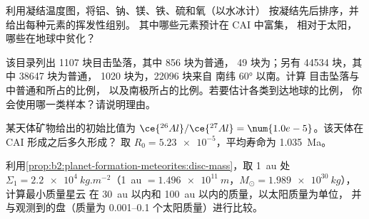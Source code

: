 \begin{exercise}[$\star$]\label{exo:b2:planet-formation-meteorites:2}
利用凝结温度图，将铝、钠、镁、铁、硫和氧（以水冰计）
按凝结先后排序，并给出每种元素的挥发性组别。
其中哪些元素预计在 CAI 中富集，
相对于太阳，哪些在地球中贫化？
\end{exercise}

\begin{exercise}[$\star$]\label{exo:b2:planet-formation-meteorites:3}
该目录列出 \num{1107} 块目击坠落，其中 856 块为普通，
49 块为；另有 \num{44534} 块，其中 \num{38647} 块为普通，
\num{1020} 块为，\num{22096} 块来自 南纬 \ang{60} 以南。计算
目击坠落与中普通和所占的比例，
以及南极所占的比例。若要估计各类到达地球的比例，
你会使用哪一类样本？请说明理由。
\end{exercise}

\begin{exercise}[$\star$]\label{exo:b2:planet-formation-meteorites:4}
某天体矿物给出的初始比值为
$\ce{^{26}Al}/\ce{^{27}Al} = \num{1.0e-5}$。该天体在 CAI 形成之后多久形成？
取 $R_0 = \num{5.23e-5}$，平均寿命为 \qty{1.035}{Ma}。
\end{exercise}

\begin{exercise}[$\star\star$]\label{exo:b2:planet-formation-meteorites:5}
利用\cref{prop:b2:planet-formation-meteorites:disc-mass}，取
\qty{1}{au} 处 $\Sigma_1 = \qty{2.2e4}{kg.m^{-2}}$（\qty{1}{au} $=
\qty{1.496e11}{m}$，$M_\odot = \qty{1.989e30}{kg}$），计算最小质量星云
在 \qty{30}{au} 以内和 \qty{100}{au} 以内的质量，以太阳质量为单位，
并与观测到的盘（质量为 \numrange{0.001}{0.1} 个太阳质量）进行比较。
\end{exercise}

